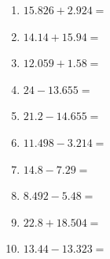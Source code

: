 \documentclass[12pt]{article}
\begin{document}
\begin{enumerate}
\newpage
\item \large $ 15.826 + 2.924 = $ \vspace{1.5cm}
\item \large $ 14.14 + 15.94 = $ \vspace{1.5cm}
\item \large $ 12.059 + 1.58 = $ \vspace{1.5cm}
\item \large $ 24 - 13.655 = $ \vspace{1.5cm}
\item \large $ 21.2 - 14.655 = $ \vspace{1.5cm}
\item \large $ 11.498 - 3.214 = $ \vspace{1.5cm}
\item \large $ 14.8 - 7.29 = $ \vspace{1.5cm}
\item \large $ 8.492 - 5.48 = $ \vspace{1.5cm}
\item \large $ 22.8 + 18.504 = $ \vspace{1.5cm}
\item \large $ 13.44 - 13.323 = $ \vspace{1.5cm}
\end{enumerate}\newpage
\end{document}
